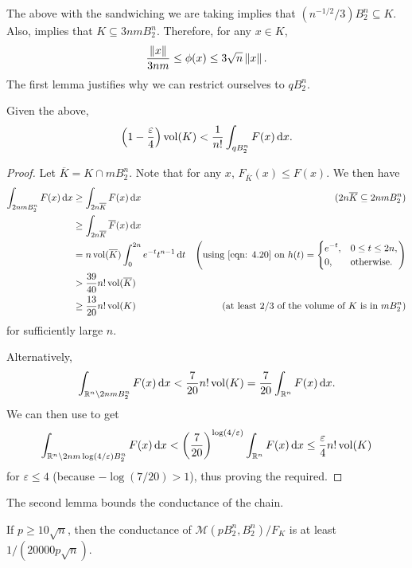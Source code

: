 The above with the sandwiching we are taking implies that $(n^{-1/2}/3) B_2^n \subseteq K$. Also,  implies that $K\subseteq 3nmB_2^n$. Therefore, for any $x\in K$,
\begin{equation}
	\label{eqn: 4.21}
	\frac{\left\lVert x\right\rVert}{3nm} \leq \phi(x) \leq 3\sqrt{n}\left\lVert x\right\rVert.
\end{equation}
The first lemma justifies why we can restrict ourselves to $qB_2^n$.

\begin{lemma}
	\label{lem 4.45}
	Given the above,
	\[ \left(1-\frac{\varepsilon}{4}\right)\operatorname{vol}(K) < \frac{1}{n!} \int_{qB_2^n} F(x)\operatorname{d}\!{x}. \]
\end{lemma}
\begin{proof}
	Let $\overline{K}=K\cap m B_2^n$. Note that for any $x$, $F_{\overline{K}}(x) \leq F(x)$. We then have
	\begin{align*}
		\int_{2nmB_2^n} F(x)\d{x} &\geq \int_{2n\overline{K}} F(x)\d{x} & (2n\overline{K}\subseteq 2nmB_2^n) \\
			&\geq \int_{2n\overline{K}} \overline{F}(x)\d{x} \\
			&= n\vol(\overline{K}) \int_0^{2n} e^{-t}t^{n-1}\d{t} & \left(\text{using \Cref{eqn: 4.20} on $h(t) = \begin{cases} e^{-t}, & 0\leq t\leq 2n, \\ 0, & \text{otherwise.} \end{cases}$}\right) \\
			&> \frac{39}{40} n! \vol(\overline{K}) \\
			&\geq \frac{13}{20} n!\vol(K) & (\text{at least $2/3$ of the volume of $K$ is in $mB_2^n$})
	\end{align*}
	for sufficiently large $n$.

	Alternatively,
	\[ \int_{\mathbb{R}^n \setminus 2nmB_2^n} F(x)\operatorname{d}\!{x} < \frac{7}{20} n! \operatorname{vol}(K) = \frac{7}{20} \int_{\mathbb{R}^n} F(x)\operatorname{d}\!{x}. \]
	We can then use  to get
	\[ \int_{\mathbb{R}^n\setminus 2nm\log(4/\varepsilon)B_2^n} F(x)\operatorname{d}\!{x} < \left(\frac{7}{20}\right)^{\log(4/\varepsilon)} \int_{\mathbb{R}^n} F(x)\operatorname{d}\!{x} \leq \frac{\varepsilon}{4} n! \operatorname{vol}(K) \]
	for $\varepsilon\leq 4$ (because $-\log(7/20)>1$), thus proving the required.
\end{proof}

The second lemma bounds the conductance of the chain.

\begin{lemma}
	\label{lem 4.46}
	If $p\geq 10\sqrt{n}$, then the conductance of $\mathcal{M}(pB_2^n, B_2^n)/F_K$ is at least $1/(20000p\sqrt{n})$.
\end{lemma}

